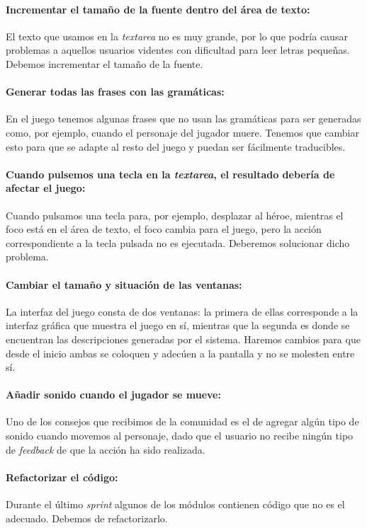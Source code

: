 \paragraph{Incrementar el tamaño de la fuente dentro del área de texto:} El texto que usamos en la \textit{textarea} no es muy grande, por lo que podría causar problemas a aquellos usuarios videntes con dificultad para leer letras pequeñas. Debemos incrementar el tamaño de la fuente.

\paragraph{Generar todas las frases con las gramáticas:} En el juego tenemos algunas frases que no usan las gramáticas para ser generadas como, por ejemplo, cuando el personaje del jugador muere. Tenemos que cambiar esto para que se adapte al resto del juego y puedan ser fácilmente traducibles.

\paragraph{Cuando pulsemos una tecla en la \textit{textarea}, el resultado debería de afectar el juego:} Cuando pulsamos una tecla para, por ejemplo, desplazar al héroe, mientras el foco está en el área de texto, el foco cambia para el juego, pero la acción correspondiente a la tecla pulsada no es ejecutada. Deberemos solucionar dicho problema.

\paragraph{Cambiar el tamaño y situación de las ventanas:} La interfaz del juego consta de dos ventanas: la primera de ellas corresponde a la interfaz gráfica que muestra el juego en sí, mientras que la segunda es donde se encuentran las descripciones generadas por el sistema. Haremos cambios para que desde el inicio ambas se coloquen y adecúen a la pantalla y no se molesten entre sí.

\paragraph{Añadir sonido cuando el jugador se mueve:} Uno de los consejos que recibimos de la comunidad es el de agregar algún tipo de sonido cuando movemos al personaje, dado que el usuario no recibe ningún tipo de \textit{feedback} de que la acción ha sido realizada.

\paragraph{Refactorizar el código:} Durante el último \textit{sprint} algunos de los módulos contienen código que no es el adecuado. Debemos de refactorizarlo.


